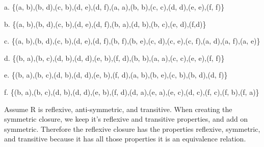 \documentclass[12pt]{article}
\begin{document}
a. \{(a, b),(b, d),(c, b),(d, e),(d, f),(a, a),(b, b),(c, c),(d, d),(e, e),(f, f)\}

b. \{(a, b),(b, d),(c, b),(d, e),(d, f),(b, a),(d, b),(b, c),(e, d),(f,d)\}

c. \{(a, b),(b, d),(c, b),(d, e),(d, f),(b, f),(b, e),(c, d),(c, e),(c, f),(a, d),(a, f),(a, e)\}

d. \{(b, a),(b, c),(d, b),(d, d),(e, b),(f, d),(b, b),(a, a),(c, c),(e, e),(f, f)\} 

e. \{(b, a),(b, c),(d, b),(d, d),(e, b),(f, d),(a, b),(b, e),(c, b),(b, d),(d, f)\} 

f. \{(b, a),(b, c),(d, b),(d, d),(e, b),(f, d),(d, a),(e, a),(e, c),(d, c),(f, c),(f, b),(f, a)\} 

Assume R is reflexive, anti-symmetric, and transitive. When creating the symmetric closure, we keep it's reflexive and transitive properties, and add on symmetric. Therefore the reflexive closure has the properties reflexive, symmetric, and transitive because it has all those properties it is an equivalence relation.
\end{document}
